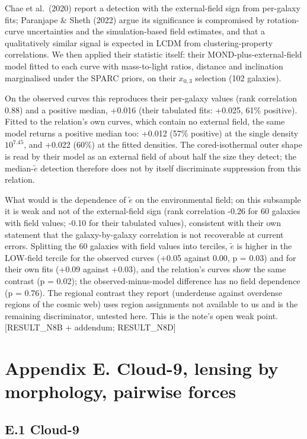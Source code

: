 \documentclass[
  10pt,
]{article}
\begin{document}
Chae et al.~(2020) report a detection with the external-field sign from per-galaxy fits; Paranjape \& Sheth (2022) argue its significance is compromised by rotation-curve uncertainties and the simulation-based field estimates, and that a qualitatively similar signal is expected in LCDM from clustering-property correlations. We then applied their statistic itself: their MOND-plus-external-field model fitted to each curve with mass-to-light ratios, distance and inclination marginalised under the SPARC priors, on their $x_{0,3}$ selection (102 galaxies).

On the observed curves this reproduces their per-galaxy values (rank correlation 0.88) and a positive median, +0.016 (their tabulated fits: +0.025, 61\% positive). Fitted to the relation's own curves, which contain no external field, the same model returns a positive median too: +0.012 (57\% positive) at the single density $10^{7.45}$, and +0.022 (60\%) at the fitted densities. The cored-isothermal outer shape is read by their model as an external field of about half the size they detect; the median-$\tilde e$ detection therefore does not by itself discriminate suppression from this relation.

What would is the dependence of $\tilde e$ on the environmental field; on this subsample it is weak and not of the external-field sign (rank correlation -0.26 for 60 galaxies with field values; -0.10 for their tabulated values), consistent with their own statement that the galaxy-by-galaxy correlation is not recoverable at current errors. Splitting the 60 galaxies with field values into terciles, $\tilde e$ is higher in the LOW-field tercile for the observed curves (+0.05 against 0.00, p = 0.03) and for their own fits (+0.09 against +0.03), and the relation's curves show the same contrast (p = 0.02); the observed-minus-model difference has no field dependence (p = 0.76). The regional contrast they report (underdense against overdense regions of the cosmic web) uses region assignments not available to us and is the remaining discriminator, untested here. This is the note's open weak point. {[}RESULT\_N8B + addendum; RESULT\_N8D{]}

\section{Appendix E. Cloud-9, lensing by morphology, pairwise forces}\label{appendix-e.-cloud-9-lensing-by-morphology-pairwise-forces}

\subsection{E.1 Cloud-9}
\end{document}

